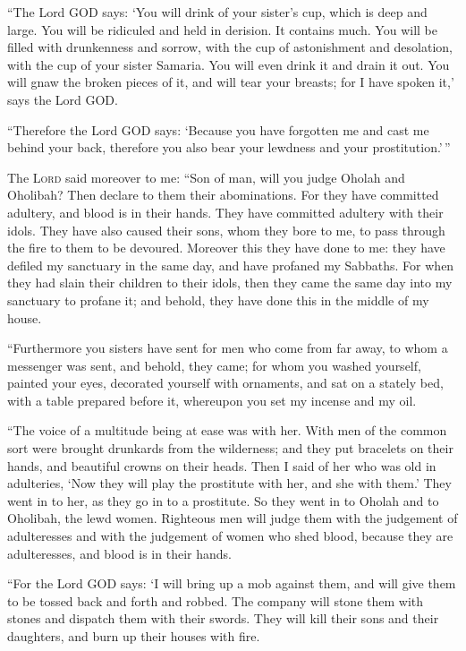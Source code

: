  ``The Lord GOD says: `You will drink of your sister's
cup, which is deep and large. You will be ridiculed and held in
derision. It contains much.  You will be filled with
drunkenness and sorrow, with the cup of astonishment and desolation,
with the cup of your sister Samaria.  You will even drink
it and drain it out. You will gnaw the broken pieces of it, and will
tear your breasts; for I have spoken it,' says the Lord GOD.

 ``Therefore the Lord GOD says: `Because you have
forgotten me and cast me behind your back, therefore you also bear your
lewdness and your prostitution.'\,''

 The \textsc{Lord} said moreover to me: ``Son of man,
will you judge Oholah and Oholibah? Then declare to them their
abominations.  For they have committed adultery, and
blood is in their hands. They have committed adultery with their idols.
They have also caused their sons, whom they bore to me, to pass through
the fire to them to be devoured.  Moreover this they have
done to me: they have defiled my sanctuary in the same day, and have
profaned my Sabbaths.  For when they had slain their
children to their idols, then they came the same day into my sanctuary
to profane it; and behold, they have done this in the middle of my
house.

 ``Furthermore you sisters have sent for men who come
from far away, to whom a messenger was sent, and behold, they came; for
whom you washed yourself, painted your eyes, decorated yourself with
ornaments,  and sat on a stately bed, with a table
prepared before it, whereupon you set my incense and my oil.

 ``The voice of a multitude being at ease was with her.
With men of the common sort were brought drunkards from the wilderness;
and they put bracelets on their hands, and beautiful crowns on their
heads.  Then I said of her who was old in adulteries,
`Now they will play the prostitute with her, and she with them.'
 They went in to her, as they go in to a prostitute. So
they went in to Oholah and to Oholibah, the lewd women. 
Righteous men will judge them with the judgement of adulteresses and
with the judgement of women who shed blood, because they are
adulteresses, and blood is in their hands.

 ``For the Lord GOD says: `I will bring up a mob against
them, and will give them to be tossed back and forth and robbed.
 The company will stone them with stones and dispatch
them with their swords. They will kill their sons and their daughters,
and burn up their houses with fire.

